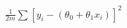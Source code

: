 \documentclass[preview]{standalone}
\begin{document}
\begin{align*}
\frac{1}{2m}\sum\left[y_i - \left(\theta_0+\theta_1x_i\right)\right]^2
\end{align*}
\end{document}

